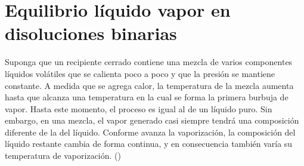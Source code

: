 \documentclass[11pt,letterpaper]{article}
\newcommand{\cita}[1]{(\cite{#1})}
\begin{document}
	
	\section{Equilibrio líquido vapor en disoluciones binarias}
	
	Suponga que un recipiente cerrado contiene una mezcla de varios componentes líquidos volátiles que se calienta poco a poco y que la presión se mantiene constante. A medida que se agrega calor, la temperatura de la mezcla aumenta hasta que alcanza una temperatura en la cual se forma la primera burbuja de vapor. Hasta este momento, el proceso es igual al de un líquido puro. Sin embargo, en una mezcla, el vapor generado casi siempre tendrá una composición diferente de la del líquido. Conforme avanza la vaporización, la composición del líquido restante cambia de forma continua, y en consecuencia también varía su temperatura de vaporización. \cita{felder}
\end{document}
